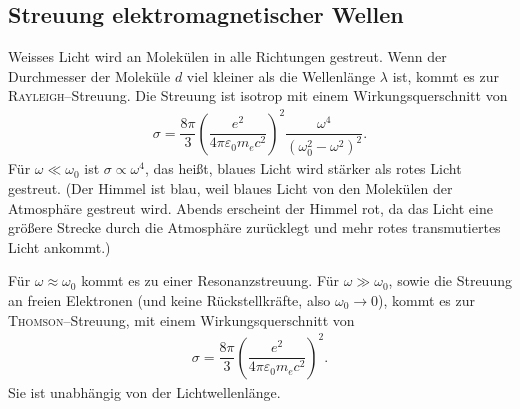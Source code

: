 \documentclass[a4paper,12pt]{article}
\numberwithin{equation}{section}
\begin{document}
\subsection{Streuung elektromagnetischer Wellen}
Weisses Licht wird an Molekülen in alle Richtungen gestreut. Wenn der Durchmesser der Moleküle $d$ viel kleiner als die Wellenlänge $\lambda $ ist, kommt es zur \textsc{Rayleigh}--Streuung. Die Streuung ist isotrop mit einem Wirkungsquerschnitt von
\begin{align} 
        \sigma =\dfrac{8\pi }{3}\left(\dfrac{e^2}{4\pi \varepsilon _0m_ec^2}\right)^2\dfrac{\omega ^4}{\left(\omega _0^2-\omega ^2\right)^2}
.\end{align} 
Für $\omega \ll \omega _0$ ist $\sigma \propto \omega ^4$, das heißt, blaues Licht wird stärker als rotes Licht gestreut. (Der Himmel ist blau, weil blaues Licht von den Molekülen der Atmosphäre gestreut wird. Abends erscheint der Himmel rot, da das Licht eine größere Strecke durch die Atmosphäre zurücklegt und mehr rotes transmutiertes Licht ankommt.)\par
Für $\omega \approx \omega _0$ kommt es zu einer Resonanzstreuung. Für $\omega \gg \omega _0$, sowie die Streuung an freien Elektronen (und keine Rückstellkräfte, also $\omega _0\rightarrow 0$), kommt es zur \textsc{Thomson}--Streuung, mit einem Wirkungsquerschnitt von
\begin{align} 
        \sigma =\dfrac{8\pi }{3}\left(\dfrac{e^2}{4\pi \varepsilon _0m_ec^2}\right)^2
.\end{align} 
Sie ist unabhängig von der Lichtwellenlänge.

\end{document}
